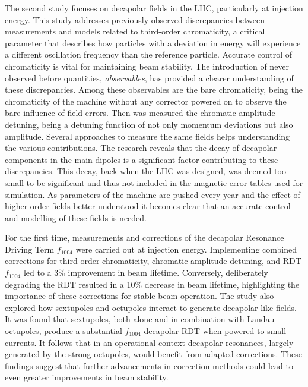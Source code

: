 {%
The second study focuses on decapolar fields in the LHC, particularly at injection energy. This
study addresses previously observed discrepancies between measurements and models related to
third-order chromaticity, a critical parameter that describes how particles with a deviation in
energy will experience a different oscillation frequency than the reference particle.
Accurate control of chromaticity is vital for maintaining beam stability. 
The introduction of never observed before quantities, \textit{observables}, has provided a
clearer understanding of these discrepancies. Among these observables are the bare
chromaticity, being the chromaticity of the machine without any corrector powered on to observe the
bare influence of field errors. Then was measured the chromatic amplitude detuning, being a detuning
function of not only momentum deviations but also amplitude. Several approaches to measure the same
fields helps understanding the various contributions.
The research reveals that the decay of decapolar components in the main dipoles is a significant
factor contributing to these discrepancies. This decay, back when the LHC was designed, was deemed
too small to be significant and thus not included in the magnetic error tables used for simulation.
As parameters of the machine are pushed every year and the effect of higher-order fields better 
understood it becomes clear that an accurate control and modelling of these fields is needed.

For the first time, measurements and corrections of the decapolar Resonance Driving
Term $f_{1004}$ were carried out at injection energy. 
Implementing combined corrections for third-order chromaticity, chromatic amplitude detuning, and
RDT $f_{1004}$ led to a 3\% improvement in beam lifetime. Conversely, deliberately degrading the RDT
resulted in a 10\% decrease in beam lifetime, highlighting the importance of these
corrections for stable beam operation. 
The study also explored how sextupoles and octupoles interact to generate decapolar-like fields. It
was found that sextupoles, both alone and in combination with Landau octupoles, produce a substantial
$f_{1004}$ decapolar RDT when powered to small currents. It follows that in an operational
context decapolar resonances, largely generated by the strong octupoles, would benefit from adapted
corrections.
These findings suggest that further advancements in correction methods could lead to even greater
improvements in beam stability.


}
